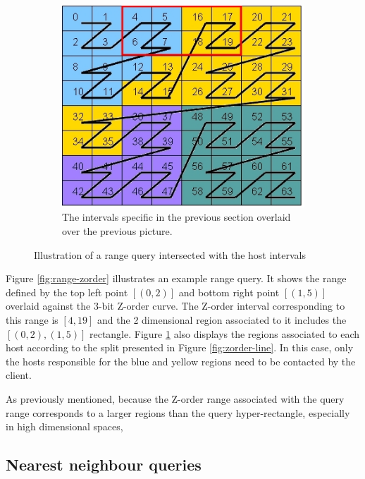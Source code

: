 \documentclass[11pt,a4paper]{globis-book}
\begin{document}
\begin{figure}[t]
\begin{subfigure}[b]{0.4\linewidth}
        \includegraphics[width = \linewidth]{images/zordering-range-intervals}
        \caption{The intervals specific in the previous section overlaid over the previous picture.}
        \label{fig:range-zorder-intervals}
    \end{subfigure}
    \caption{Illustration of a range query intersected with the host intervals}
    \label{fig:range}
\end{figure}

Figure \ref{fig:range-zorder} illustrates an example range query. It shows the range defined by the top left point $[(0, 2)]$ and bottom right point $[(1, 5)]$ overlaid against the 3-bit Z-order curve. The Z-order interval corresponding to this range is $[4, 19]$ and the 2 dimensional region associated to it includes the $[(0, 2), (1, 5)]$ rectangle. Figure \ref{fig:range-zorder-intervals} also displays the regions associated to each host according to the split presented in Figure \ref{fig:zorder-line}. In this case, only the hosts responsible for the blue and yellow regions need to be contacted by the client. 

As previously mentioned, because the Z-order range associated with the query range corresponds to a larger regions than the query hyper-rectangle, especially in high dimensional spaces, 

\subsection{Nearest neighbour queries}
\end{document}
